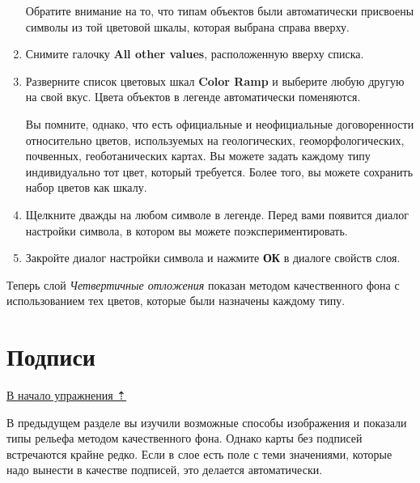 \documentclass[]{book}
\theoremstyle{definition}
\theoremstyle{definition}
\theoremstyle{definition}
\theoremstyle{remark}
\begin{document}
\begin{enumerate}
  Обратите внимание на то, что типам объектов были автоматически
  присвоены символы из той цветовой шкалы, которая выбрана справа
  вверху.
\item
  Снимите галочку \textbf{All other values}, расположенную вверху
  списка.
\item
  Разверните список цветовых шкал \textbf{Color Ramp} и выберите любую
  другую на свой вкус. Цвета объектов в легенде автоматически
  поменяются.

  Вы помните, однако, что есть официальные и неофициальные
  договоренности относительно цветов, используемых на геологических,
  геоморфологических, почвенных, геоботанических картах. Вы можете
  задать каждому типу индивидуально тот цвет, который требуется. Более
  того, вы можете сохранить набор цветов как шкалу.
\item
  Щелкните дважды на любом символе в легенде. Перед вами появится диалог
  настройки символа, в котором вы можете поэкспериментировать.
\item
  Закройте диалог настройки символа и нажмите \textbf{ОК} в диалоге
  свойств слоя.
\end{enumerate}

Теперь слой \emph{Четвертичные отложения} показан методом качественного
фона с использованием тех цветов, которые были назначены каждому типу.

\hypertarget{map-design-quaternary-labels}{%
\section{Подписи}\label{map-design-quaternary-labels}}

\protect\hyperlink{map-design-quaternary}{В начало упражнения ⇡}

В предыдущем разделе вы изучили возможные способы изображения и показали
типы рельефа методом качественного фона. Однако карты без подписей
встречаются крайне редко. Если в слое есть поле с теми значениями,
которые надо вынести в качестве подписей, это делается автоматически.
\end{document}
